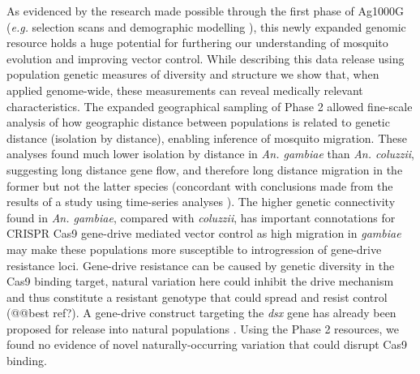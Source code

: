 \documentclass[a4paper,11pt,abstracton,hidelinks]{scrartcl}
\begin{document}
As evidenced by the research made possible through the first phase of Ag1000G \cite{Ag1000gConsortium2017} (\textit{e.g.} selection scans \cite{xue2019} and demographic modelling \cite{khatri2018}), this newly expanded genomic resource holds a huge potential for furthering our understanding of mosquito evolution and improving vector control.
%
While describing this data release using population genetic measures of diversity and structure we show that, when applied genome-wide, these measurements can reveal medically relevant characteristics.
%
The expanded geographical sampling of Phase 2 allowed fine-scale analysis of how geographic distance between populations is related to genetic distance (isolation by distance), enabling inference of mosquito migration.
%
These analyses found much lower isolation by distance in \textit{An. gambiae} than \textit{An. coluzzii}, suggesting long distance gene flow, and therefore long distance migration in the former but not the latter species (concordant with conclusions made from the results of a study using time-series analyses \cite{dao2014}).
%
The higher genetic connectivity found in \textit{An. gambiae}, compared with \textit{coluzzii}, has important connotations for CRISPR Cas9 gene-drive mediated vector control as high migration in \textit{gambiae} may make these populations more susceptible to introgression of gene-drive resistance loci.
%
Gene-drive resistance can be caused by genetic diversity in the Cas9 binding target, natural variation here could inhibit the drive mechanism and thus constitute a resistant genotype that could spread and resist control (@@best ref?).
%
A gene-drive construct targeting the \textit{dsx} gene has already been proposed for release into natural populations \cite{kyrou2018}.
%
Using the Phase 2 resources, we found no evidence of novel naturally-occurring variation that could disrupt Cas9 binding.
\end{document}
